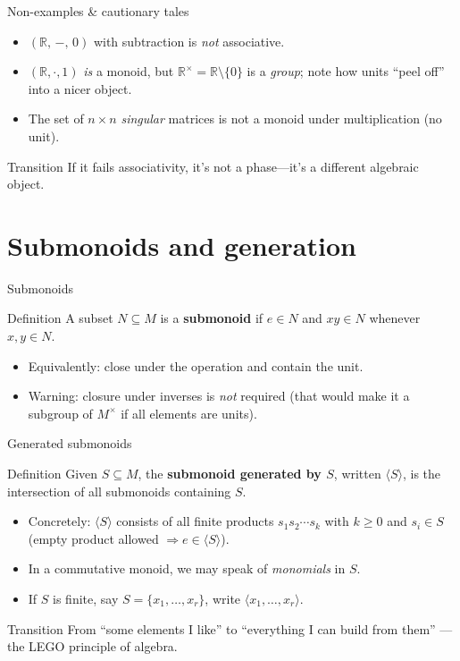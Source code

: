 \documentclass[aspectratio=169,11pt]{beamer}
\newcommand{\RR}{\mathbb{R}}
\begin{document}
\begin{frame}{Non-examples \& cautionary tales}
\begin{itemize}
  \item $(\RR,\,-,\,0)$ with subtraction is \emph{not} associative.
  \item $(\RR,\cdot,1)$ \emph{is} a monoid, but $\RR^\times=\RR\setminus\{0\}$ is a \emph{group}; note how units “peel off” into a nicer object.
  \item The set of $n\times n$ \emph{singular} matrices is not a monoid under multiplication (no unit).
\end{itemize}
\begin{block}{Transition}
If it fails associativity, it’s not a phase—it’s a different algebraic object.
\end{block}
\end{frame}

\section{Submonoids and generation}
\begin{frame}{Submonoids}
\begin{block}{Definition}
A subset $N\subseteq M$ is a \textbf{submonoid} if $e\in N$ and $xy\in N$ whenever $x,y\in N$.
\end{block}
\begin{itemize}
  \item Equivalently: close under the operation and contain the unit.
  \item Warning: closure under inverses is \emph{not} required (that would make it a subgroup of $M^\times$ if all elements are units).
\end{itemize}
\end{frame}

\begin{frame}{Generated submonoids}
\begin{block}{Definition}
Given $S\subseteq M$, the \textbf{submonoid generated by $S$}, written $\langle S\rangle$, is the intersection of all submonoids containing $S$.
\end{block}
\begin{itemize}
  \item Concretely: $\langle S\rangle$ consists of all finite products $s_1s_2\cdots s_k$ with $k\ge 0$ and $s_i\in S$ (empty product allowed $\Rightarrow e\in\langle S\rangle$).
  \item In a commutative monoid, we may speak of \emph{monomials} in $S$.
  \item If $S$ is finite, say $S=\{x_1,\dots,x_r\}$, write $\langle x_1,\dots,x_r\rangle$.
\end{itemize}
\begin{block}{Transition}
From “some elements I like” to “everything I can build from them” — the LEGO principle of algebra.
\end{block}
\end{frame}
\end{document}
